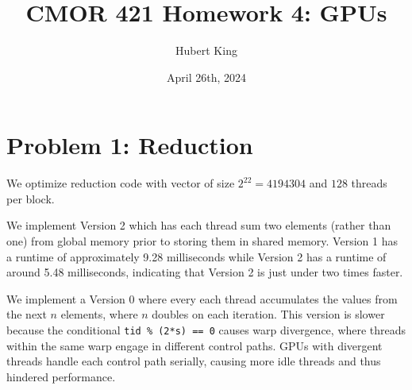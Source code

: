 \documentclass{article}
\title{CMOR 421 Homework 4: GPUs}
\author{Hubert King}
\date{April 26th, 2024}
\begin{document}
\maketitle

\section*{Problem 1: Reduction}
We optimize reduction code with vector of size $2^{22}=4194304$ and $128$ threads per block. 

We implement Version 2 which has each thread sum two elements (rather than one) from global memory prior to storing them in shared memory. Version 1 has a runtime of approximately 9.28 milliseconds while Version 2 has a runtime of around 5.48 milliseconds, indicating that Version 2 is just under two times faster.

We implement a Version 0 where every each thread accumulates the values from the next $n$ elements, where $n$ doubles on each iteration. This version is slower because the conditional \verb|tid % (2*s) == 0|
causes warp divergence, where threads within the same warp engage in different control paths. GPUs with divergent threads handle each control path serially, causing more idle threads and thus hindered performance.
\end{document}
